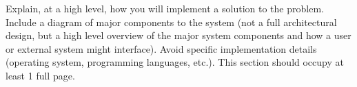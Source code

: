 Explain, at a high level, how you will implement a solution to the problem. Include a diagram of major components to the system (not a full architectural design, but a high level overview of the major system components and how a user or external system might interface). Avoid specific implementation details (operating system, programming languages, etc.). This section should occupy at least 1 full page.